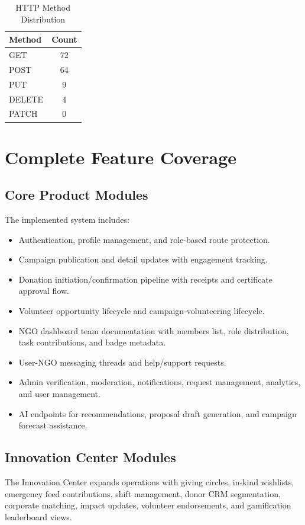 \documentclass[conference]{IEEEtran}
\begin{document}
\begin{table}[htbp]
\caption{HTTP Method Distribution}
\begin{center}
\begin{tabular}{|l|c|}
\hline
\textbf{Method} & \textbf{Count} \\
\hline
GET & 72 \\
POST & 64 \\
PUT & 9 \\
DELETE & 4 \\
PATCH & 0 \\
\hline
\end{tabular}
\label{tab:methods}
\end{center}
\end{table}

\section{Complete Feature Coverage}
\subsection{Core Product Modules}
The implemented system includes:
\begin{itemize}
  \item Authentication, profile management, and role-based route protection.
  \item Campaign publication and detail updates with engagement tracking.
  \item Donation initiation/confirmation pipeline with receipts and certificate approval flow.
  \item Volunteer opportunity lifecycle and campaign-volunteering lifecycle.
  \item NGO dashboard team documentation with members list, role distribution, task contributions, and badge metadata.
  \item User-NGO messaging threads and help/support requests.
  \item Admin verification, moderation, notifications, request management, analytics, and user management.
  \item AI endpoints for recommendations, proposal draft generation, and campaign forecast assistance.
\end{itemize}

\subsection{Innovation Center Modules}
The Innovation Center expands operations with giving circles, in-kind wishlists, emergency feed contributions, shift management, donor CRM segmentation, corporate matching, impact updates, volunteer endorsements, and gamification leaderboard views.
\end{document}
